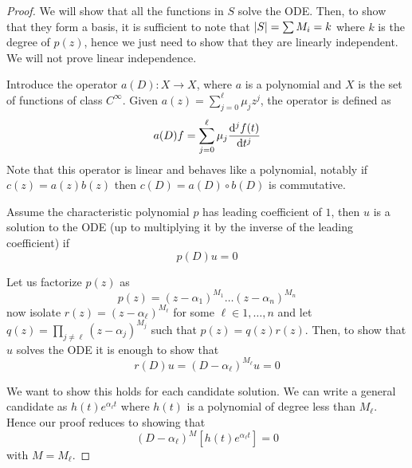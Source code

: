 \documentclass[12pt]{extarticle}
\numberwithin{equation}{section}
\begin{document}
\begin{proof}
    We will show that all the functions in $S$ solve the ODE.
    Then, to show that they form a basis, it is sufficient to note that
    $\abs{S} = \sum M_i = k$ where $k$ is the degree of $p(z)$,
    hence we just need to show that they are linearly independent.
    We will not prove linear independence.

    Introduce the operator $a(D) : X \to X$, where $a$ is a polynomial and
    $X$ is the set of functions of class $C^\infty$.
    Given $a(z) = \sum_{j= 0}^\ell \mu_j z^j$, the operator is defined as
    \begin{equation}
        a(D)f = \sum^{\ell}_{j = 0} \mu_j \dv[j]{f(t)}{t}
    \end{equation}
    Note that this operator is linear and behaves like a polynomial,
    notably if $c(z) = a(z)b(z)$ then $c(D) = a(D) \circ b(D)$ is commutative.

    Assume the characteristic polynomial $p$ has leading coefficient of $1$,
    then $u$ is a solution to the ODE (up to multiplying it by the inverse of the leading coefficient) if
    \begin{equation}
        p(D)u = 0
    \end{equation}

    Let us factorize $p(z)$ as
    \begin{equation}
        p(z) = (z-\alpha_1)^{M_1} \dots (z-\alpha_n)^{M_n}
    \end{equation}
    now isolate $r(z) = (z-\alpha_\ell)^{M_\ell}$ for some $\ell \in 1, \dots, n$
    and let $q(z) = \prod_{j \neq \ell} (z-\alpha_j)^{M_j}$
    such that $p(z) = q(z)r(z)$.
    Then, to show that $u$ solves the ODE it is enough to show that
    \begin{equation}
        r(D)u = (D - \alpha_\ell)^{M_\ell}u = 0
    \end{equation}

    We want to show this holds for each candidate solution.
    We can write a general candidate as $h(t) e^{\alpha_\ell t}$
    where $h(t)$ is a polynomial of degree less than $M_\ell$.
    Hence our proof reduces to showing that
    \begin{equation}
        (D - \alpha_\ell)^{M} [h(t) e^{\alpha_\ell t}] = 0
    \end{equation}
    with $M = M_\ell$.


\end{proof}
\end{document}

